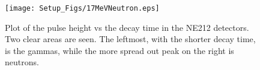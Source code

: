 \begin{figure}[t]
    \centering
    \texttt{[image: Setup\_Figs/17MeVNeutron.eps]}
    \caption{Plot of the pulse height vs the decay time in the NE212 detectors. Two clear areas are seen. The leftmost, with the shorter decay time, is the gammas, while the more spread out peak on the right is neutrons.}
    \label{fig:neutron}
\end{figure}